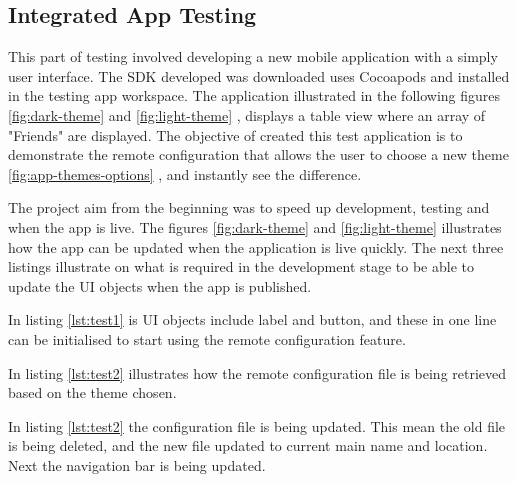 \newpage

\subsection{Integrated App Testing}

This part of testing involved developing a new mobile application with a simply user interface. The SDK developed was downloaded uses Cocoapods and installed in the testing app workspace. The application illustrated in the following figures \ref{fig:dark-theme} and \ref{fig:light-theme} , displays a table view where an array of "Friends" are displayed. The objective of created this test application is to demonstrate the remote configuration that allows the user to choose a new theme \ref{fig:app-themes-options} , and instantly see the difference.

The project aim from the beginning was to speed up development, testing and when the app is live. The figures \ref{fig:dark-theme} and \ref{fig:light-theme} illustrates how the app can be updated when the application is live quickly. The next three listings illustrate on what is required in the development stage to be able to update the UI objects when the app is published. 

In listing \ref{lst:test1} is UI objects include label and button, and these in one line can be initialised to start using the remote configuration feature.



In listing \ref{lst:test2} illustrates how the remote configuration file is being retrieved based on the theme chosen.



In listing \ref{lst:test2} the configuration file is being updated. This mean the old file is being deleted, and the new file updated to current main name and location. Next the navigation bar is being updated.



